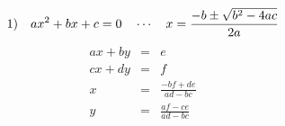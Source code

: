 \documentclass[uplatex]{ujsarticle}
\begin{document}
\begin{equation}
\LARGE{ 1) \hspace{10pt} ax^2+bx+c = 0\hspace{10pt}\cdots \hspace{10pt} x = \frac{-b\pm\sqrt{b^2-4ac}}{2a}}
\end{equation}
\begin{eqnarray*}
 ax + by &=& e  \\
 cx + dy &=& f 	\\

 x &=& \frac{ - bf + de}{ad -bc} \\
 y &=& \frac{af-ce}{ad-bc} 
\end{eqnarray*}
\end{document}
